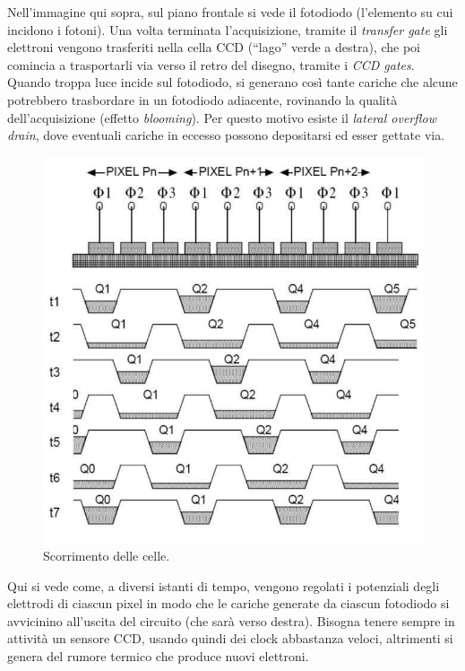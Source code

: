 \documentclass[a4paper,11pt]{article}
\begin{document}
Nell'immagine qui sopra, sul piano frontale si vede il fotodiodo (l'elemento su cui incidono i fotoni). Una volta terminata l'acquisizione,
tramite il \textit{transfer gate} gli elettroni vengono trasferiti nella cella CCD (``lago'' verde a destra), che poi comincia a trasportarli via verso il retro del disegno, tramite i \textit{CCD gates}.
Quando troppa luce incide sul fotodiodo, si generano così tante cariche che alcune potrebbero trasbordare in un fotodiodo adiacente, rovinando la qualità dell'acquisizione
(effetto \textit{blooming}).
Per questo motivo esiste il \textit{lateral overflow drain}, dove eventuali cariche in eccesso possono depositarsi ed esser gettate via.

\renewcommand{\thefigure}{3.11}
\begin{figure}[!h]
  \centering
    \includegraphics[scale=0.5]{images/3/shifting.png}
    \caption{Scorrimento delle celle.}
\end{figure}

Qui si vede come, a diversi istanti di tempo, vengono regolati i potenziali degli elettrodi di ciascun pixel in modo che le cariche generate da ciascun fotodiodo si avvicinino
all'uscita del circuito (che sarà verso destra). Bisogna tenere sempre in attività un sensore CCD, usando quindi dei clock abbastanza veloci, altrimenti si genera del rumore termico
che produce nuovi elettroni.
\end{document}
